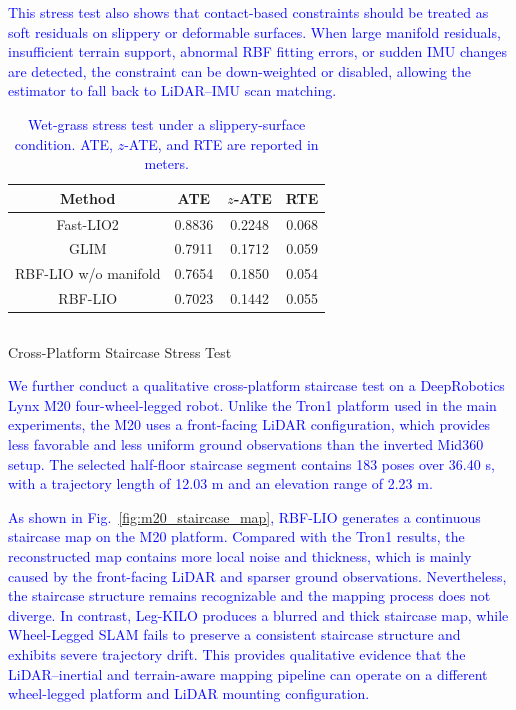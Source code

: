 \documentclass[journal,twoside,web]{ieeecolor}
\makeatletter
\newcommand{\cs}[1]{\textcolor{blue}{#1}}
\let\origsubsection\subsection
\def\subsection{\@ifstar\subsectionstarcolor\subsectioncolorcmd}
\def\subsectioncolorcmd#1{\origsubsection{\textcolor{subsectioncolor}{#1}}}
\def\subsectionstarcolor#1{\origsubsection*{#1}}
\makeatother
\begin{document}
\cs{This stress test also shows that contact-based constraints should be treated as soft residuals on slippery or deformable surfaces. When large manifold residuals, insufficient terrain support, abnormal RBF fitting errors, or sudden IMU changes are detected, the constraint can be down-weighted or disabled, allowing the estimator to fall back to LiDAR--IMU scan matching.}

\begin{table}[!t]
\centering
\caption{\cs{Wet-grass stress test under a slippery-surface condition. ATE, $z$-ATE, and RTE are reported in meters.}}
\label{tab:wet_grass_stress}
\footnotesize
\renewcommand{\arraystretch}{1.15}
\setlength{\tabcolsep}{12.0pt}
\begin{tabular}{|c|c|c|c|}
\hline
Method & ATE & $z$-ATE & RTE \\
\hline
Fast-LIO2 & 0.8836 & 0.2248 & 0.068 \\

GLIM & 0.7911 & 0.1712 & 0.059 \\

RBF-LIO w/o manifold & 0.7654 & 0.1850 & 0.054 \\

RBF-LIO & 0.7023 & 0.1442 & 0.055 \\
\hline
\end{tabular}
\renewcommand{\arraystretch}{1.0}
\end{table}


\subsection{Cross-Platform Staircase Stress Test}
\label{subsec:m20_cross_platform}

\cs{We further conduct a qualitative cross-platform staircase test on a DeepRobotics Lynx M20 four-wheel-legged robot. Unlike the Tron1 platform used in the main experiments, the M20 uses a front-facing LiDAR configuration, which provides less favorable and less uniform ground observations than the inverted Mid360 setup. The selected half-floor staircase segment contains 183 poses over 36.40 s, with a trajectory length of 12.03 m and an elevation range of 2.23 m.}

\cs{As shown in Fig.~\ref{fig:m20_staircase_map}, RBF-LIO generates a continuous staircase map on the M20 platform. Compared with the Tron1 results, the reconstructed map contains more local noise and thickness, which is mainly caused by the front-facing LiDAR and sparser ground observations. Nevertheless, the staircase structure remains recognizable and the mapping process does not diverge. In contrast, Leg-KILO produces a blurred and thick staircase map, while Wheel-Legged SLAM fails to preserve a consistent staircase structure and exhibits severe trajectory drift. This provides qualitative evidence that the LiDAR--inertial and terrain-aware mapping pipeline can operate on a different wheel-legged platform and LiDAR mounting configuration.}
\end{document}
